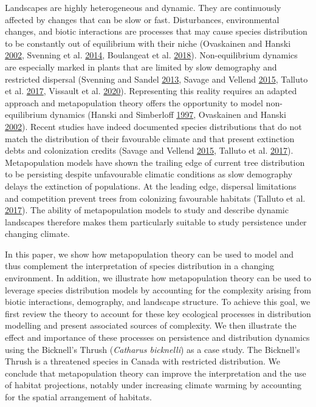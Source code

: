 \documentclass[12pt]{article}
\begin{document}
Landscapes are highly heterogeneous and dynamic. They are continuously
affected by changes that can be slow or fast. Disturbances,
environmental changes, and biotic interactions are processes that may
cause species distribution to be constantly out of equilibrium with
their niche (Ovaskainen and Hanski
\protect\hyperlink{ref-ovaskainen_transient_2002}{2002}, Svenning et al.
\protect\hyperlink{ref-svenning_influence_2014}{2014}, Boulangeat et al.
\protect\hyperlink{ref-boulangeat_transient_2018}{2018}).
Non-equilibrium dynamics are especially marked in plants that are
limited by slow demography and restricted dispersal (Svenning and Sandel
\protect\hyperlink{ref-svenning_disequilibrium_2013}{2013}, Savage and
Vellend \protect\hyperlink{ref-savage_elevational_2015}{2015}, Talluto
et al. \protect\hyperlink{ref-talluto_extinction_2017}{2017}, Vissault
et al. \protect\hyperlink{ref-vissault_slow_2020}{2020}). Representing
this reality requires an adapted approach and metapopulation theory
offers the opportunity to model non-equilibrium dynamics (Hanski and
Simberloff \protect\hyperlink{ref-hanski_metapopulation_1997}{1997},
Ovaskainen and Hanski
\protect\hyperlink{ref-ovaskainen_transient_2002}{2002}). Recent studies
have indeed documented species distributions that do not match the
distribution of their favourable climate and that present extinction
debts and colonization credits (Savage and Vellend
\protect\hyperlink{ref-savage_elevational_2015}{2015}, Talluto et al.
\protect\hyperlink{ref-talluto_extinction_2017}{2017}). Metapopulation
models have shown the trailing edge of current tree distribution to be
persisting despite unfavourable climatic conditions as slow demography
delays the extinction of populations. At the leading edge, dispersal
limitations and competition prevent trees from colonizing favourable
habitats (Talluto et al.
\protect\hyperlink{ref-talluto_extinction_2017}{2017}). The ability of
metapopulation models to study and describe dynamic landscapes therefore
makes them particularly suitable to study persistence under changing
climate.

In this paper, we show how metapopulation theory can be used to model
and thus complement the interpretation of species distribution in a
changing environment. In addition, we illustrate how metapopulation
theory can be used to leverage species distribution models by accounting
for the complexity arising from biotic interactions, demography, and
landscape structure. To achieve this goal, we first review the theory to
account for these key ecological processes in distribution modelling and
present associated sources of complexity. We then illustrate the effect
and importance of these processes on persistence and distribution
dynamics using the Bicknell's Thrush (\emph{Catharus bicknelli}) as a
case study. The Bicknell's Thrush is a threatened species in Canada with
restricted distribution. We conclude that metapopulation theory can
improve the interpretation and the use of habitat projections, notably
under increasing climate warming by accounting for the spatial
arrangement of habitats.
\end{document}
